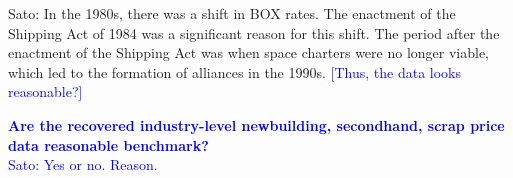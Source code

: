 Sato: In the 1980s, there was a shift in BOX rates. The enactment of the Shipping Act of 1984 was a significant reason for this shift. The period after the enactment of the Shipping Act was when space charters were no longer viable, which led to the formation of alliances in the 1990s. \textcolor{blue}{[Thus, the data looks reasonable?]}


\textcolor{blue}{
\textbf{Are the recovered industry-level newbuilding, secondhand, scrap price data reasonable benchmark?} \\
Sato: Yes or no. Reason.
}
